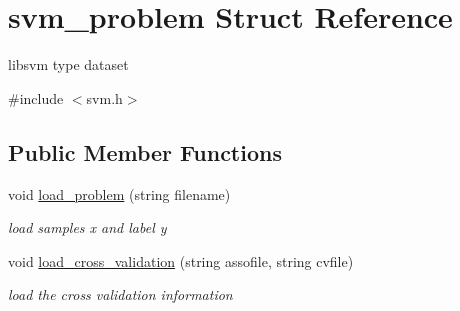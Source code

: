 \hypertarget{structsvm__problem}{\section{svm\+\_\+problem Struct Reference}
\label{structsvm__problem}
}


libsvm type dataset  




{\ttfamily \#include $<$svm.\+h$>$}

\subsection*{Public Member Functions}
\begin{DoxyCompactItemize}
\item 
void \hyperlink{structsvm__problem_a5c804b187898f3598c98385cc8805c0a}{load\+\_\+problem} (string filename)
\begin{DoxyCompactList}\small\item\em load samples x and label y \end{DoxyCompactList}\item 
void \hyperlink{structsvm__problem_a61028ca606e7ff6a551400ad71ab8497}{load\+\_\+cross\+\_\+validation} (string assofile, string cvfile)
\begin{DoxyCompactList}\small\item\em load the cross validation information \end{DoxyCompactList}\end{DoxyCompactItemize}
